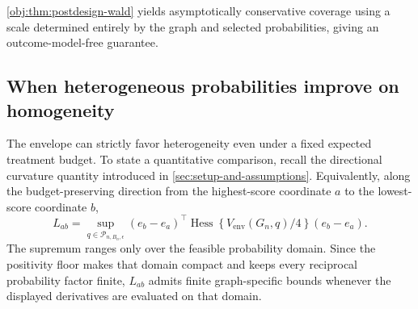 \documentclass[11pt]{article}
\begin{document}
\cref{obj:thm:postdesign-wald} yields asymptotically conservative coverage using a scale determined entirely by the graph and selected probabilities, giving an outcome-model-free guarantee.

\subsection{When heterogeneous probabilities improve on homogeneity}

The envelope can strictly favor heterogeneity even under a fixed expected treatment budget. To state a quantitative comparison, recall the directional curvature quantity introduced in \cref{sec:setup-and-assumptions}. Equivalently, along the budget-preserving direction from the highest-score coordinate \(a\) to the lowest-score coordinate \(b\),
\[
L_{ab}
=
\sup_{q\in\mathcal P_{n,B_n,\epsilon}}
(e_b-e_a)^\top
\operatorname{Hess}\!\left\{V_{\mathrm{env}}(G_n,q)/4\right\}
(e_b-e_a).
\]
The supremum ranges only over the feasible probability domain. Since the positivity floor makes that domain compact and keeps every reciprocal probability factor finite, \(L_{ab}\) admits finite graph-specific bounds whenever the displayed derivatives are evaluated on that domain.
\end{document}
